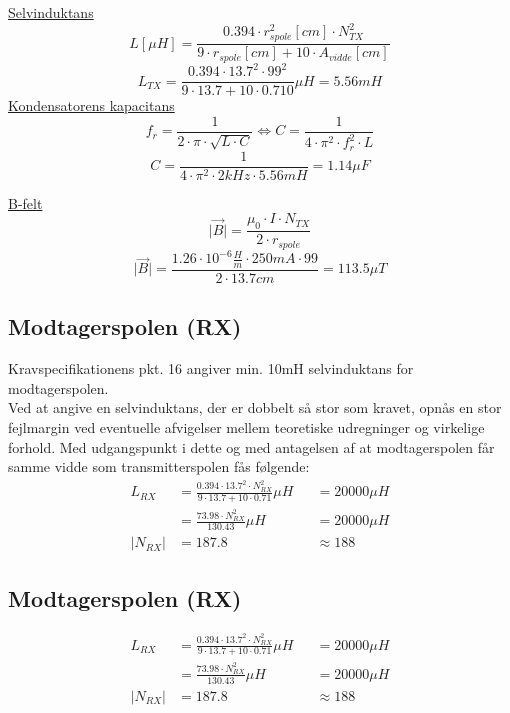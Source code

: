 \underline{Selvinduktans}
$$\boxed{L[\mu H] = \frac{0.394\cdot r_{spole}^2[cm]\cdot N_{TX}^2}{9\cdot r_{spole}[cm]+10\cdot A_{vidde}[cm]}}$$
$$ L_{TX} = \frac{0.394 \cdot 13.7^2 \cdot 99^2}{9 \cdot 13.7 + 10 \cdot 0.710}\mu H = 5.56mH$$
\underline{Kondensatorens kapacitans}
$$\boxed{f_r= \frac{1}{2\cdot\pi\cdot\sqrt{L \cdot C}} \Leftrightarrow C = \frac{1}{4\cdot\pi^2\cdot f_r^2\cdot L}}$$
$$C = \frac{1}{4\cdot \pi^2\cdot 2kHz\cdot 5.56mH} =1.14\mu F$$

\underline{B-felt}
$$\boxed{\lvert \overrightarrow{B} \rvert = \frac{\mu_0\cdot I\cdot N_{TX}}{2\cdot r_{spole}}}$$
$$\lvert \overrightarrow{B} \rvert = \frac{1.26\cdot10^{-6}\frac{H}{m}\cdot250mA\cdot 99}{2\cdot 13.7cm} = 113.5\mu T$$

\subsection{Modtagerspolen (RX)}
Kravspecifikationens pkt. 16 angiver min. 10mH selvinduktans for modtagerspolen.\\
Ved at angive en selvinduktans, der er dobbelt så stor som kravet, opnås en stor fejlmargin ved eventuelle afvigelser mellem teoretiske udregninger og virkelige forhold.
Med udgangspunkt i dette og med antagelsen af at modtagerspolen får samme vidde som transmitterspolen fås følgende:
\begin{align*}
    L_{RX} &= \frac{0.394\cdot 13.7^2\cdot N_{RX}^2}{9\cdot13.7+10\cdot0.71}\mu H & &=20000\mu H\\
           &= \frac{73.98\cdot N_{RX}^2}{130.43} \mu H                            & &=20000\mu H\\
    \lvert N_{RX} \rvert &= 187.8                                                 & &\approx 188
\end{align*}

\subsection{Modtagerspolen (RX)}
\begin{align*}
    L_{RX} &= \frac{0.394\cdot 13.7^2\cdot N_{RX}^2}{9\cdot13.7+10\cdot0.71}\mu H & &=20000\mu H\\
           &= \frac{73.98\cdot N_{RX}^2}{130.43} \mu H                            & &=20000\mu H\\
    \lvert N_{RX} \rvert &= 187.8                                                 & &\approx 188
\end{align*}